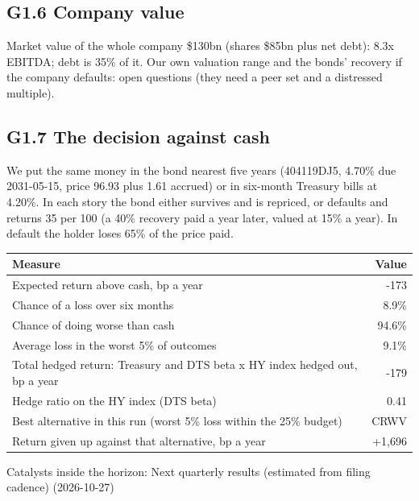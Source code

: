 \documentclass[11pt,a4paper]{article}
\begin{document}
\subsection*{G1.6 Company value}
Market value of the whole company \$130bn (shares \$85bn plus net debt): 8.3x EBITDA; debt is 35\% of it. Our own valuation range and the bonds' recovery if the company defaults: open questions (they need a peer set and a distressed multiple).
\subsection*{G1.7 The decision against cash}
We put the same money in the bond nearest five years (404119DJ5, 4.70\% due 2031-05-15, price 96.93 plus 1.61 accrued) or in six-month Treasury bills at 4.20\%. In each story the bond either survives and is repriced, or defaults and returns 35 per 100 (a 40\% recovery paid a year later, valued at 15\% a year). In default the holder loses 65\% of the price paid.
\begin{center}\footnotesize\setlength{\tabcolsep}{3.5pt}\begin{tabular}{@{}lr@{}}\toprule
Measure & Value \\\midrule
Expected return above cash, bp a year & -173 \\
Chance of a loss over six months & 8.9\% \\
Chance of doing worse than cash & 94.6\% \\
Average loss in the worst 5\% of outcomes & 9.1\% \\
Total hedged return: Treasury and DTS beta x HY index hedged out, bp a year & -179 \\
Hedge ratio on the HY index (DTS beta) & 0.41 \\
Best alternative in this run (worst 5\% loss within the 25\% budget) & CRWV \\
Return given up against that alternative, bp a year & +1,696 \\
\bottomrule\end{tabular}\end{center}
Catalysts inside the horizon: Next quarterly results (estimated from filing cadence) (2026-10-27)
\end{document}

